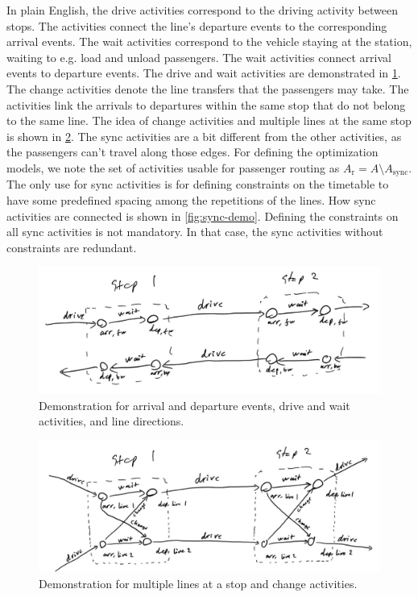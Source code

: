 \documentclass[english, 12pt, a4paper, sci, utf8, a-2b, online]{aaltothesis}
\newcommand{\Async}{A_\text{sync}}
\newcommand{\Ar}{A_\text{r}}
\begin{document}
In plain English, the drive activities correspond to the driving activity between stops. The activities connect the line's departure events to the corresponding arrival events. The wait activities correspond to the vehicle staying at the station, waiting to e.g. load and unload passengers. The wait activities connect arrival events to departure events. The drive and wait activities are demonstrated in \cref{fig:drive-wait-demo}. The change activities denote the line transfers that the passengers may take. The activities link the arrivals to departures within the same stop that do not belong to the same line. The idea of change activities and multiple lines at the same stop is shown in \cref{fig:change-demo}. The sync activities are a bit different from the other activities, as the passengers can't travel along those edges. For defining the optimization models, we note the set of activities usable for passenger routing as $\Ar = A \setminus \Async$. The only use for sync activities is for defining constraints on the timetable to have some predefined spacing among the repetitions of the lines. How sync activities are connected is shown in \cref{fig:sync-demo}. Defining the constraints on all sync activities is not mandatory. In that case, the sync activities without constraints are redundant.


\begin{figure}
    \centering
    \includegraphics[width=1.0\textwidth]{figures/drive-wait-demo.jpg}
    \caption{Demonstration for arrival and departure events, drive and wait activities, and line directions.}
    \label{fig:drive-wait-demo}
\end{figure}

\begin{figure}
    \centering
    \includegraphics[width=1.0\textwidth]{figures/change-demo.jpg}
    \caption{Demonstration for multiple lines at a stop and change activities.}
    \label{fig:change-demo}
\end{figure}
\end{document}
